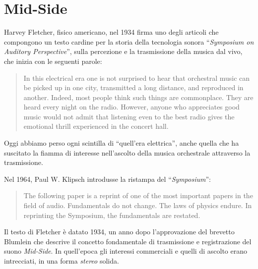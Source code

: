 \section{Mid-Side}

Harvey Fletcher, fisico americano, nel 1934 firma uno degli articoli che
compongono un testo cardine per la storia della tecnologia sonora
“\emph{Symposium on Auditory Perspective}”, sulla percezione e la trasmissione
della musica dal vivo, che inizia con le seguenti parole:

\begin{quote}
In this electrical era one is not surprised to hear that orchestral music can be
picked up in one city, transmitted a long distance, and reproduced in another.
Indeed, most people think such things are commonplace. They are heard every
night on the radio. However, anyone who appreciates good music would not admit
that listening even to the best radio gives the emotional thrill experienced in
the concert hall. \cite{hf34}
\end{quote}

Oggi abbiamo perso ogni scintilla di “quell'era elettrica”, anche quella che ha
suscitato la fiamma di interesse nell'ascolto della musica orchestrale
attraverso la trasmissione.


Nel 1964, Paul W. Klipsch introdusse la ristampa del “\emph{Symposium}”:

\begin{quote}
The following paper is a reprint of one of the most important papers in the
field of audio. Fundamentals do not change. The laws of physics endure. In
reprinting the Symposium, the fundamentals are restated. \cite{sap1964}
\end{quote}

Il testo di Fletcher \cite{hf34} è datato 1934, un anno dopo l'approvazione
del brevetto Blumlein che descrive il concetto fondamentale di trasmissione e
registrazione del suono \emph{Mid-Side}. In quell'epoca gli interessi commerciali e
quelli di ascolto erano intrecciati, in una forma \emph{stereo} solida.

